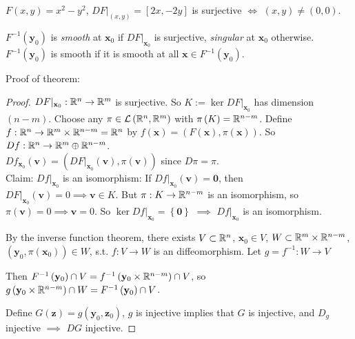 \documentclass[a4paper]{article}
\begin{document}
\begin{eg}
$F\left(x,y\right) = x^2-y^2$, $DF|_{(x,y)} = \left[2x,-2y\right]$ is surjective $\iff$ $\left(x,y\right) \neq \left(0,0\right)$.
\end{eg}

\begin{defi}
$F^{-1}\left(\mathbf{y}_0\right)$ is \emph{smooth} at $\mathbf{x}_0$ if $DF|_{\mathbf{x}_0}$ is surjective, \emph{singular} at $\mathbf{x}_0$ otherwise.\\
$F^{-1}\left(\mathbf{y}_0\right)$ is smooth if it is smooth at all $\mathbf{x} \in F^{-1} \left(\mathbf{y}_0\right)$.
\end{defi}

Proof of theorem:
\begin{proof}
$DF|_{\mathbf{x}_0}: \mathbb{R}^n \to \mathbb{R}^m$ is surjective. So $K := \ker DF|_{\mathbf{x}_0}$ has dimension $(n-m)$. Choose any $\pi \in \mathcal{L}\left(\mathbb{R}^n,\mathbb{R}^m\right)$ with $\pi\left(K\right) = \mathbb{R}^{n-m}$. Define $f: \mathbb{R}^n \to \mathbb{R}^m \times \mathbb{R}^{n-m} = \mathbb{R}^n$ by $f\left(\mathbf{x}\right) = \left(F\left(\mathbf{x}\right),\pi\left(\mathbf{x}\right)\right)$. So $Df:\mathbb{R}^n \to \mathbb{R}^m \oplus \mathbb{R}^{n-m}$.\\
$Df_{\mathbf{x}_0} \left(\mathbf{v}\right) = \left(DF|_{\mathbf{x}_0} \left(\mathbf{v}\right), \pi\left(\mathbf{v}\right)\right)$ since $D\pi = \pi$.\\
Claim: $Df|_{\mathbf{x}_0}$ is an isomorphism: If $Df|_{\mathbf{x}_0} \left(\mathbf{v}\right) = \mathbf{0}$, then $DF|_{\mathbf{x}_0} \left(\mathbf{v}\right) = 0 \implies \mathbf{v} \in K$. But $\pi: K \to \mathbb{R}^{n-m}$ is an isomorphism, so $\pi\left(\mathbf{v}\right) = 0 \implies \mathbf{v} = 0$. So $\ker Df|_{\mathbf{x}_0} = \left\{\mathbf{0}\right\}$ $\implies$ $Df|_{\mathbf{x}_0}$ is an isomorphism.

By the inverse function theorem, there exists $V \subset \mathbb{R}^n$, $\mathbf{x}_0 \in V$, $W \subset \mathbb{R}^m \times \mathbb{R}^{n-m}$, $\left(\mathbf{y}_0,\pi\left(\mathbf{x}_0\right)\right) \in W$, s.t. $f:V \to W$ is an diffeomorphism. Let $g = f^{-1} : W \to V$

Then $F^{-1}\left(\mathbf{y}_0\right) \cap V = f^{-1} \left(\mathbf{y}_0 \times \mathbb{R}^{n-m}\right) \cap V$, so $g\left(\mathbf{y}_0 \times \mathbb{R}^{n-m} \right) \cap W = F^{-1}\left(\mathbf{y}_0\right) \cap V$.

Define $G\left(\mathbf{z}\right) = g\left(\mathbf{y}_0,\mathbf{z}_0\right)$, $g$ is injective implies that $G$ is injective, and $D_g$ injective $\implies$ $DG$ injective.
\end{proof}
\end{document}
